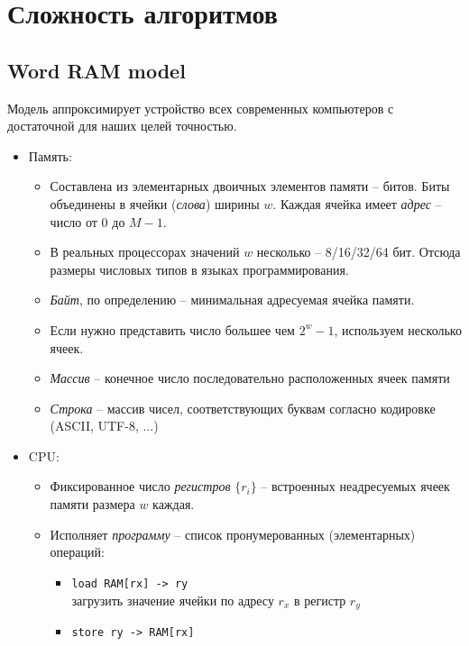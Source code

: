 \documentclass[12pt,a4paper]{report}
\begin{document}
\chapter*{Сложность алгоритмов}


\section*{Word RAM model}

Модель аппроксимирует устройство всех современных компьютеров с достаточной для наших целей точностью.

\begin{itemize}
  \item Память: 
  \begin{itemize}
    \item Составлена из элементарных двоичных элементов памяти -- битов. Биты объединены в ячейки ({\em слова}) ширины $w$. Каждая ячейка имеет {\em адрес} -- число от $0$ до $M-1$.
    \item В реальных процессорах значений $w$ несколько -- 8/16/32/64 бит. Отсюда размеры числовых типов в языках программирования.
    \item {\em Байт}, по определению -- минимальная адресуемая ячейка памяти.
    \item Если нужно представить число большее чем $2^w-1$, используем несколько ячеек.
    \item {\em Массив} -- конечное число последовательно расположенных ячеек памяти
    \item {\em Строка} -- массив чисел, соответствующих буквам согласно кодировке (ASCII, UTF-8, ...)
  \end{itemize}
  \item CPU: 
  \begin{itemize}
    \item Фиксированное число {\em регистров} $\{r_i\}$ -- встроенных неадресуемых ячеек памяти размера $w$ каждая.
    \item Исполняет {\em программу} -- список пронумерованных (элементарных) операций:
    \begin{itemize}
      \item {\tt load RAM[rx] -> ry}\\
          загрузить значение ячейки по адресу $r_x$ в регистр $r_y$
      \item {\tt store ry -> RAM[rx]}\\

\end{itemize}
\end{itemize}
\end{itemize}
\end{document}
